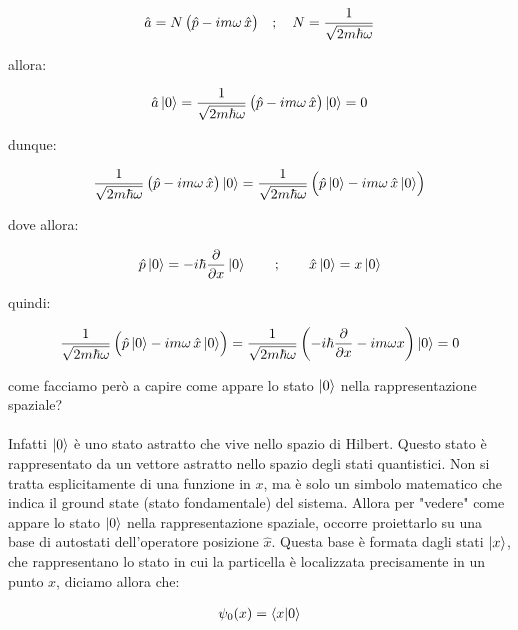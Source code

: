 \begin{align*}
	\hat{a} = N \, \qty\big(\hat{p} - im\omega \, \hat{x}) \quad ; \quad N = \frac{1}{\sqrt{2m\hbar \omega}}
\end{align*}

	allora:

\begin{align*}
	\hat{a}\ket{0} =  \frac{1}{\sqrt{2m\hbar \omega}} \, \qty\big(\hat{p} - im\omega \, \hat{x}) \ket{0} = 0
\end{align*}

	dunque:

\begin{align*}
	\frac{1}{\sqrt{2m\hbar \omega}} \, \qty\big(\hat{p} - im\omega \, \hat{x}) \ket{0} = \frac{1}{\sqrt{2m\hbar \omega}} \, \qty\Big(\hat{p} \ket{0} - im\omega \, \hat{x} \ket{0}) 
\end{align*}

	dove allora:
	
\begin{align*}
	\hat{p}\ket{0} = - i \hbar \pdv{x} \ket{0} \qquad ; \qquad \hat{x}\ket{0} = x \ket{0} 
\end{align*}

	quindi:

\begin{align*}
	\frac{1}{\sqrt{2m\hbar \omega}} \, \qty\Big(\hat{p} \ket{0} - im\omega \, \hat{x} \ket{0})  = \frac{1}{\sqrt{2m\hbar \omega}} \, \qty( - i \hbar \pdv{x} - im\omega x) \ket{0} = 0 
\end{align*}

	come facciamo però a capire come appare lo stato $\ket{0}$ nella rappresentazione spaziale?
	\\
	\\
	Infatti $\ket{0}$ è uno stato astratto che vive nello spazio di Hilbert. Questo stato è rappresentato da un vettore astratto nello spazio degli stati quantistici. Non si tratta esplicitamente di una funzione in $x$, ma è solo un simbolo matematico che indica il ground state (stato fondamentale) del sistema. Allora per "vedere" come appare lo stato $\ket{0}$ nella rappresentazione spaziale, occorre proiettarlo su una base di autostati dell’operatore posizione $\hat{x}$. Questa base è formata dagli stati $\ket{x}$, che rappresentano lo stato in cui la particella è localizzata precisamente in un punto $x$, diciamo allora che:
	
\begin{align*}
	\psi_0(x) = \braket{x}{0}
\end{align*}

